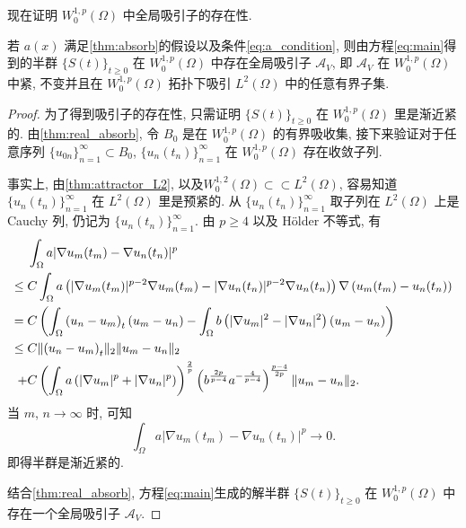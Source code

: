 \documentclass[oneside,longtitle]{LZUthesis}
\numberwithin{equation}{chapter}
\newcommand*\abs[1]{\lvert#1\rvert}
\newcommand*\norm[1]{\lVert#1\rVert}
\newcommand*\Brace[1]{\lbrace#1\rbrace}
\begin{document}
现在证明
$W_0^{1,p}(\Omega)$ 中全局吸引子的存在性.
\begin{theorem}
	若 $a(x)$ 满足\cref{thm:absorb}的假设以及条件\eqref{eq:a_condition},
	则由方程\eqref{eq:main}得到的半群 $\Brace{S(t)}_{t \geq 0}$ 在 $W_0^{1,p}(\Omega)$
	中存在全局吸引子 $\mathcal{A}_V$, 即
	$\mathcal{A}_V$ 在 $W_0^{1,p}(\Omega)$ 中紧, 不变并且在 $W_0^{1,p}(\Omega)$
	拓扑下吸引 $L^2(\Omega)$ 中的任意有界子集.
\end{theorem}
\begin{proof}
	为了得到吸引子的存在性,
	只需证明 $\Brace{S(t)}_{t \geq 0}$ 在 $W_0^{1,p}(\Omega)$ 里是渐近紧的.
	由\cref{thm:real_absorb}, 令 $B_0$ 是在 $W_0^{1,p}(\Omega)$ 的有界吸收集,
	接下来验证对于任意序列
	$\Brace{u_{0n}}_{n=1}^{\infty} \subset B_0$, $\Brace{u_n(t_n)}_{n=1}^{\infty}$
	在 $W_0^{1,p}(\Omega)$ 存在收敛子列.

	事实上, 由\cref{thm:attractor_L2}, 以及$W_0^{1,2}(\Omega) \subset\subset L^2(\Omega)$,
	容易知道
	$\Brace{u_n(t_n)}_{n=1}^{\infty}$ 在 $L^2(\Omega)$ 里是预紧的.
	从 $\Brace{u_n(t_n)}_{n=1}^{\infty}$ 取子列在 $L^2(\Omega)$ 上是 Cauchy 列,
	仍记为 $\Brace{u_n(t_n)}_{n=1}^{\infty}$. 由 $p \geq 4$ 以及
	H\"older 不等式, 有
	\begin{equation*}
		\begin{split}
			& \int_{\Omega}a\abs{\nabla u_m(t_m) - \nabla u_n(t_n)}^p\\
			\leq{} & C\int_{\Omega}a
			\left(\abs{\nabla u_m(t_m)}^{p-2}\nabla u_m(t_m)
			- \abs{\nabla u_n(t_n)}^{p-2}\nabla u_n(t_n)\right)
			\*\nabla\left(u_m(t_m) - u_n(t_n)\right)\\
			={} & C\left(\int_{\Omega}\left(u_n-u_m\right)_t\left(u_m-u_n\right)
			- \int_{\Omega}b\left(\abs{\nabla u_m}^2 - \abs{\nabla u_n}^2\right)
			\left(u_m - u_n\right)\right)\\
			\leq{} & C\norm{\left(u_n-u_m\right)_t}_2\norm{u_m-u_n}_2\\
			+{} & C\left(\int_{\Omega}a\left(\abs{\nabla u_m}^p
			+ \abs{\nabla u_n}^p\right)\right)^{\frac{2}{p}}
			\left(b^{\frac{2p}{p-4}}a^{-\frac{4}{p-4}}\right)^{\frac{p-4}{2p}}
			\norm{u_m-u_n}_2.
		\end{split}
	\end{equation*}
	当 $m$, $n \to \infty$ 时, 可知
	\begin{equation*}
		\int_{\Omega}a\abs{\nabla u_m(t_m) - \nabla u_n(t_n)}^p \to 0.
	\end{equation*}
	即得半群是渐近紧的.

	结合\cref{thm:real_absorb}, 方程\cref{eq:main}生成的解半群 $\Brace{S(t)}_{t \geq 0}$ 在 $W_0^{1, p}(\Omega)$ 中
	存在一个全局吸引子 $\mathcal{A}_V$.
\end{proof}
\end{document}
